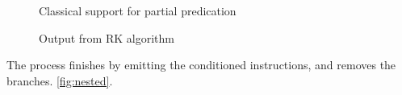 \begin{figure}
{    \label{fig:nested2}}
\caption{Classical support for partial predication}
\label{fig:trad_part_pred}
\end{figure}

\begin{figure}
\footnotesize
\caption{Output from RK algorithm}
\label{fig:RK}
\end{figure}

The process finishes by emitting the conditioned instructions, and removes the branches. \ref{fig:nested}. 

